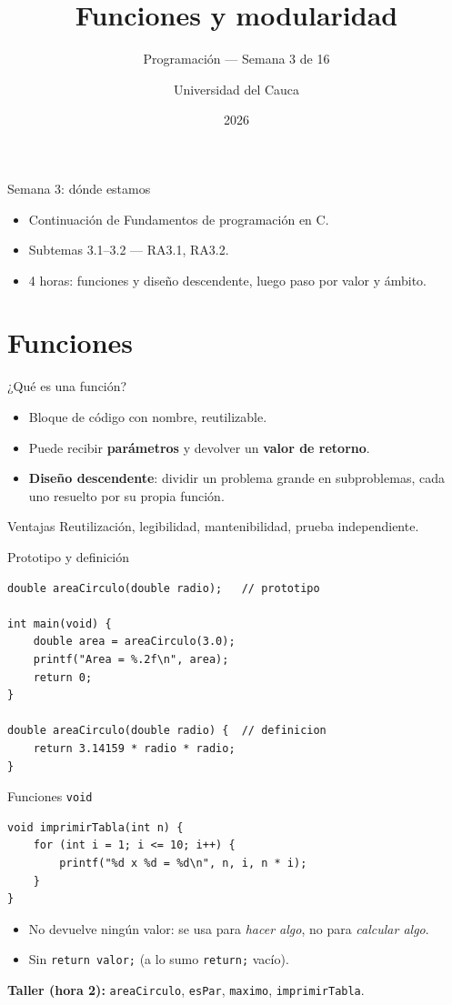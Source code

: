 \documentclass[11pt]{beamer}
\title[Semana 3: Funciones]{Funciones y modularidad}
\subtitle{Programación --- Semana 3 de 16}
\author{Universidad del Cauca}
\date{2026}
\begin{document}
\begin{frame}
  \titlepage
\end{frame}

\begin{frame}{Semana 3: dónde estamos}
  \begin{itemize}
    \item Continuación de Fundamentos de programación en C.
    \item Subtemas 3.1--3.2 --- RA3.1, RA3.2.
    \item 4 horas: funciones y diseño descendente, luego paso por valor y ámbito.
  \end{itemize}
  \tableofcontents
\end{frame}

\section{Funciones}

\begin{frame}{¿Qué es una función?}
  \begin{itemize}
    \item Bloque de código con nombre, reutilizable.
    \item Puede recibir \textbf{parámetros} y devolver un \textbf{valor de retorno}.
    \item \textbf{Diseño descendente}: dividir un problema grande en subproblemas, cada uno
          resuelto por su propia función.
  \end{itemize}
  \begin{block}{Ventajas}
    Reutilización, legibilidad, mantenibilidad, prueba independiente.
  \end{block}
\end{frame}

\begin{frame}[fragile]{Prototipo y definición}
\begin{lstlisting}
double areaCirculo(double radio);   // prototipo

int main(void) {
    double area = areaCirculo(3.0);
    printf("Area = %.2f\n", area);
    return 0;
}

double areaCirculo(double radio) {  // definicion
    return 3.14159 * radio * radio;
}
\end{lstlisting}
\end{frame}

\begin{frame}[fragile]{Funciones \texttt{void}}
\begin{lstlisting}
void imprimirTabla(int n) {
    for (int i = 1; i <= 10; i++) {
        printf("%d x %d = %d\n", n, i, n * i);
    }
}
\end{lstlisting}
  \begin{itemize}
    \item No devuelve ningún valor: se usa para \emph{hacer algo}, no para \emph{calcular algo}.
    \item Sin \texttt{return valor;} (a lo sumo \texttt{return;} vacío).
  \end{itemize}
  \vfill
  \textbf{Taller (hora 2):} \texttt{areaCirculo}, \texttt{esPar}, \texttt{maximo},
  \texttt{imprimirTabla}.
\end{frame}
\end{document}
